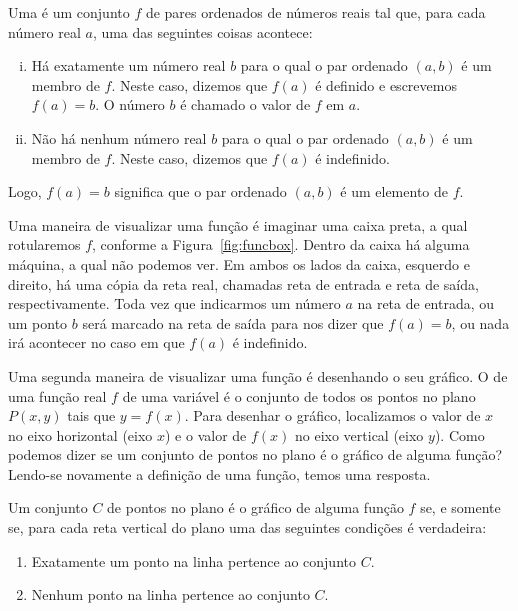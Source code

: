\documentclass{svmono}
\begin{document}
\begin{defin}
Uma  é um conjunto $f$ de pares
ordenados de números reais tal que, para cada número real $a$, uma
das seguintes coisas acontece:

\begin{enumerate}[(i)]
\item Há exatamente um número real $b$ para o qual o par ordenado $(a,b)$
é um membro de $f$. Neste caso, dizemos que $f(a)$ é definido e
escrevemos $f(a) = b$. O número $b$ é chamado o valor de $f$ em $a$.
\item Não há nenhum número real $b$ para o qual o par ordenado $(a,b)$
é um membro de $f$. Neste caso, dizemos que $f(a)$ é indefinido.
\end{enumerate}
\end{defin}

Logo, $f(a) = b$ significa que o par ordenado $(a,b)$ é um elemento
de $f$.

Uma maneira de visualizar uma função é imaginar uma caixa preta, a qual
rotularemos $f$, conforme a Figura~\ref{fig:funcbox}. Dentro da caixa há
alguma máquina, a qual não podemos ver. Em ambos os lados da caixa,
esquerdo e direito, há uma cópia da reta real, chamadas reta de entrada
e reta de saída, respectivamente. Toda vez que indicarmos um número $a$
na reta de entrada, ou um ponto $b$ será marcado na reta de saída para
nos dizer que $f(a) = b$, ou nada irá acontecer no caso em que $f(a)$
é indefinido.


Uma segunda maneira de visualizar uma função é desenhando o seu gráfico.
O  de uma função real $f$ de uma variável é o conjunto de
todos os pontos no plano $P(x,y)$ tais que $y = f(x)$. Para desenhar o
gráfico, localizamos o valor de $x$ no eixo horizontal (eixo $x$) e
o valor de $f(x)$ no eixo vertical (eixo $y$). Como podemos dizer se
um conjunto de pontos no plano é o gráfico de alguma função? Lendo-se
novamente a definição de uma função, temos uma resposta.

Um conjunto $C$ de pontos no plano é o gráfico de alguma função $f$ se,
e somente se, para cada reta vertical do plano uma das seguintes
condições é verdadeira:
\begin{enumerate}[(1)]
\item Exatamente um ponto na linha pertence ao conjunto $C$.
\item Nenhum ponto na linha pertence ao conjunto $C$.
\end{enumerate}
\end{document}
